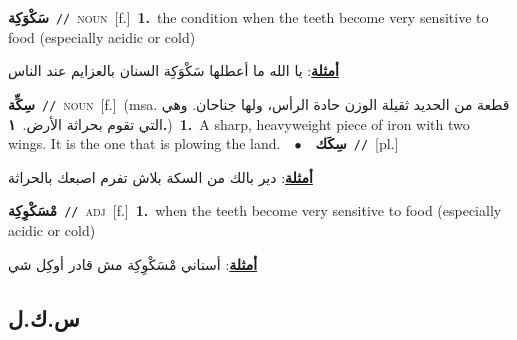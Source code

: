 \documentclass[10pt,a4paper,twoside]{article} %
\begin{document}
\begin{multicols}{2}
{\setlength\topsep{0pt}\textbf{\foreignlanguage{arabic}{سَكْوَكِة}}\ {\color{gray}\texttt{//}\color{black}}\ \textsc{noun}\ [f.]\ \textbf{1.}~the condition when the teeth become very sensitive to food (especially acidic or cold)\  \begin{flushright}\color{gray}\foreignlanguage{arabic}{\textbf{\underline{\foreignlanguage{arabic}{أمثلة}}}: يا الله ما أعطلها سَكْوَكِة السنان بالعزايم عند الناس}\end{flushright}\color{black}} \vspace{2mm}

{\setlength\topsep{0pt}\textbf{\foreignlanguage{arabic}{سِكِّة}}\ {\color{gray}\texttt{//}\color{black}}\ \textsc{noun}\ [f.]\ \color{gray}(msa. \foreignlanguage{arabic}{قطعة من الحديد ثقيلة الوزن حادة الرأس، ولها جناحان. وهي التي تقوم بحراثة الأرض.}~\foreignlanguage{arabic}{\textbf{١.}})\color{black}\ \textbf{1.}~A sharp, heavyweight piece of iron with two wings. It is the one that is plowing the land.\ \ $\bullet$\ \ \setlength\topsep{0pt}\textbf{\foreignlanguage{arabic}{سِكَك}}\ {\color{gray}\texttt{//}\color{black}}\ [pl.]\  \begin{flushright}\color{gray}\foreignlanguage{arabic}{\textbf{\underline{\foreignlanguage{arabic}{أمثلة}}}: دير بالك من السكة بلاش تفرم اصبعك بالحراثة}\end{flushright}\color{black}} \vspace{2mm}

{\setlength\topsep{0pt}\textbf{\foreignlanguage{arabic}{مْسَكْوِكِة}}\ {\color{gray}\texttt{//}\color{black}}\ \textsc{adj}\ [f.]\ \textbf{1.}~when the teeth become very sensitive to food (especially acidic or cold)\  \begin{flushright}\color{gray}\foreignlanguage{arabic}{\textbf{\underline{\foreignlanguage{arabic}{أمثلة}}}: أسناني مْسَكْوِكِة مش قادر أوكِل شي}\end{flushright}\color{black}} \vspace{2mm}

\vspace{-3mm}
\subsection*{\color{blue}\foreignlanguage{arabic}{س.ك.ل}\color{blue}{ (ntws)}} 


\end{multicols}
\end{document}
